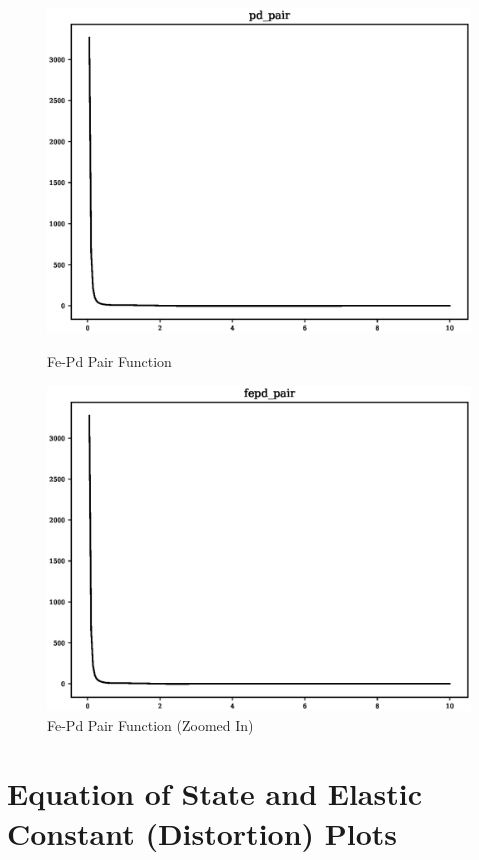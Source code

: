 \begin{figure}[ht] 
  \begin{minipage}[b]{0.4\linewidth}
    \centering
    \includegraphics[width=.9\linewidth]{chapters/results_potential_fitting/pot_fepd_fcc_2/pd_pair.eps} 
    \caption{Fe-Pd Pair Function}  
  \end{minipage}%
  \begin{minipage}[b]{0.4\linewidth}
    \centering
    \includegraphics[width=.9\linewidth]{chapters/results_potential_fitting/pot_fepd_fcc_2/fepd_pair.eps} 
    \caption{Fe-Pd Pair Function (Zoomed In)}  
  \end{minipage}%
\end{figure}


\FloatBarrier
\section{Equation of State and Elastic Constant (Distortion) Plots}
\label{section:fepdv2eosec}



